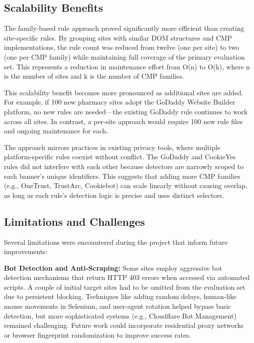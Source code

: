 \documentclass[conference]{IEEEtran}
\begin{document}
\subsection{Scalability Benefits}

The family-based rule approach proved significantly more efficient than creating site-specific rules. By grouping sites with similar DOM structures and CMP implementations, the rule count was reduced from twelve (one per site) to two (one per CMP family) while maintaining full coverage of the primary evaluation set. This represents a reduction in maintenance effort from O(n) to O(k), where n is the number of sites and k is the number of CMP families.

This scalability benefit becomes more pronounced as additional sites are added. For example, if 100 new pharmacy sites adopt the GoDaddy Website Builder platform, no new rules are needed—the existing GoDaddy rule continues to work across all sites. In contrast, a per-site approach would require 100 new rule files and ongoing maintenance for each.

The approach mirrors practices in existing privacy tools, where multiple platform-specific rules coexist without conflict. The GoDaddy and CookieYes rules did not interfere with each other because detectors are narrowly scoped to each banner's unique identifiers. This suggests that adding more CMP families (e.g., OneTrust, TrustArc, Cookiebot) can scale linearly without causing overlap, as long as each rule's detection logic is precise and uses distinct selectors.

\subsection{Limitations and Challenges}

Several limitations were encountered during the project that inform future improvements:

\textbf{Bot Detection and Anti-Scraping:} Some sites employ aggressive bot detection mechanisms that return HTTP 403 errors when accessed via automated scripts. A couple of initial target sites had to be omitted from the evaluation set due to persistent blocking. Techniques like adding random delays, human-like mouse movements in Selenium, and user-agent rotation helped bypass basic detection, but more sophisticated systems (e.g., Cloudflare Bot Management) remained challenging. Future work could incorporate residential proxy networks or browser fingerprint randomization to improve success rates.
\end{document}

